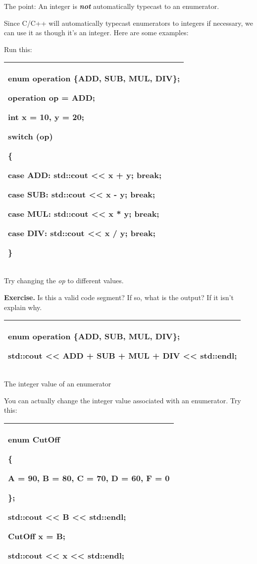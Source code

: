 \documentclass[
]{article}
\begin{document}
The point: An integer is \emph{\textbf{not}} automatically typecast to
an enumerator.

Since C/C++ will automatically typecast enumerators to integers if
necessary, we can use it as though it's an integer. Here are some
examples:

Run this:

\begin{longtable}[]{@{}l@{}}
\toprule
\endhead
\begin{minipage}[t]{0.97\columnwidth}\raggedright
enum operation \{ADD, SUB, MUL, DIV\};

operation op = ADD;

int x = 10, y = 20;

switch (op)

\{

case ADD: std::cout \textless\textless{} x + y; break;

case SUB: std::cout \textless\textless{} x - y; break;

case MUL: std::cout \textless\textless{} x * y; break;

case DIV: std::cout \textless\textless{} x / y; break;

\}\strut
\end{minipage}\tabularnewline
\bottomrule
\end{longtable}

Try changing the \emph{op} to different values.

\textbf{Exercise.} Is this a valid code segment? If so, what is the
output? If it isn't explain why.

\begin{longtable}[]{@{}l@{}}
\toprule
\endhead
\begin{minipage}[t]{0.97\columnwidth}\raggedright
enum operation \{ADD, SUB, MUL, DIV\};

std::cout \textless\textless{} ADD + SUB + MUL + DIV
\textless\textless{} std::endl;\strut
\end{minipage}\tabularnewline
\bottomrule
\end{longtable}

The integer value of an enumerator

You can actually change the integer value associated with an enumerator.
Try this:

\begin{longtable}[]{@{}l@{}}
\toprule
\endhead
\begin{minipage}[t]{0.97\columnwidth}\raggedright
enum CutOff

\{

A = 90, B = 80, C = 70, D = 60, F = 0

\};

std::cout \textless\textless{} B \textless\textless{} std::endl;

CutOff x = B;

std::cout \textless\textless{} x \textless\textless{} std::endl;\strut
\end{minipage}\tabularnewline
\bottomrule
\end{longtable}
\end{document}
